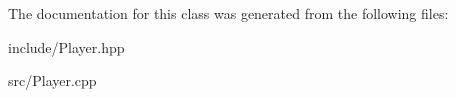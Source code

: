 \-The documentation for this class was generated from the following files\-:\begin{DoxyCompactItemize}
\item 
include/\-Player.\-hpp\item 
src/\-Player.\-cpp\end{DoxyCompactItemize}
